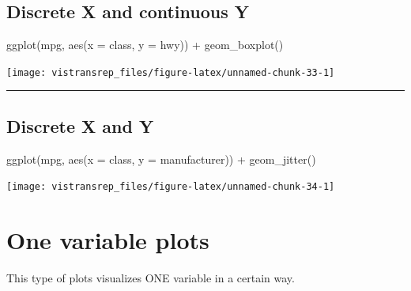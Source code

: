 \documentclass[]{book}
\newenvironment{Shaded}{}{}
\newcommand{\DataTypeTok}[1]{#1}
\newcommand{\KeywordTok}[1]{\textcolor[rgb]{0.00,0.00,1.00}{#1}}
\newcommand{\NormalTok}[1]{#1}
\newcommand{\OperatorTok}[1]{#1}
\newcommand{\StringTok}[1]{\textcolor[rgb]{0.00,0.50,0.50}{#1}}
\begin{document}
\hypertarget{discrete-x-and-continuous-y}{%
\subsection{Discrete X and continuous Y}\label{discrete-x-and-continuous-y}}

\begin{Shaded}
\begin{Highlighting}[]
\KeywordTok{ggplot}\NormalTok{(mpg, }\KeywordTok{aes}\NormalTok{(}\DataTypeTok{x =}\NormalTok{ class, }\DataTypeTok{y =}\NormalTok{ hwy)) }\OperatorTok{+}
\StringTok{  }\KeywordTok{geom_boxplot}\NormalTok{()}
\end{Highlighting}
\end{Shaded}

\begin{flushright}\texttt{[image: vistransrep\_files/figure-latex/unnamed-chunk-33-1]} \end{flushright}

\begin{center}\rule{0.5\linewidth}{\linethickness}\end{center}

\hypertarget{discrete-x-and-y}{%
\subsection{Discrete X and Y}\label{discrete-x-and-y}}

\begin{Shaded}
\begin{Highlighting}[]
\KeywordTok{ggplot}\NormalTok{(mpg, }\KeywordTok{aes}\NormalTok{(}\DataTypeTok{x =}\NormalTok{ class, }\DataTypeTok{y =}\NormalTok{ manufacturer)) }\OperatorTok{+}
\StringTok{  }\KeywordTok{geom_jitter}\NormalTok{()}
\end{Highlighting}
\end{Shaded}

\begin{flushright}\texttt{[image: vistransrep\_files/figure-latex/unnamed-chunk-34-1]} \end{flushright}

\hypertarget{one-variable-plots}{%
\section{One variable plots}\label{one-variable-plots}}

This type of plots visualizes ONE variable in a certain way.
\end{document}
